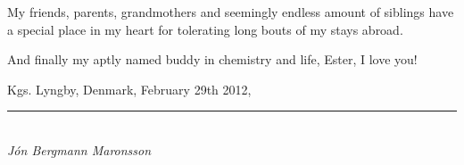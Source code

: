My friends, parents, grandmothers and seemingly endless amount of siblings have a special place in my heart for tolerating long bouts of my stays abroad.

And finally my aptly named buddy in chemistry and life, Ester, I love you!


\vspace{10mm}
\begin{flushright}
Kgs. Lyngby, Denmark, February 29th 2012,\\

\vspace{10mm}

\rule{50mm}{0.1pt}\\
\textit{J\'on Bergmann Maronsson}
\end{flushright}
